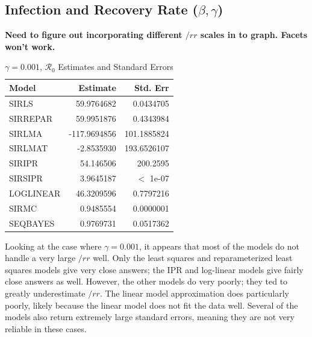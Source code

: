 \documentclass[12pt]{article}
\newcommand{\rr}{\ensuremath{\mathcal{R}_0}}
\begin{document}
\subsection{Infection and Recovery Rate ($\beta, \gamma$)}\label{sec:res-beta-gamma}

\textbf{Need to figure out incorporating different $/rr$ scales in to graph. Facets won't work.}

\begin{table}[H]
	
	\caption{\label{tab:}$\gamma = 0.001$, $\rr$ Estimates and Standard Errors}
	\centering
	\begin{tabular}[t]{l|r|r}
		\hline
		Model & Estimate & Std. Err\\
		\hline
		SIRLS & 59.9764682 & 0.0434705\\
		\hline
		SIRREPAR & 59.9951876 & 0.4343984\\
		\hline
		SIRLMA &  -117.9694856 & 101.1885824\\
		\hline
		SIRLMAT & -2.8535930 & 193.6526107 \\
		\hline
		SIRIPR & 54.146506 & 200.2595\\
		\hline
		SIRSIPR & 3.9645187 & $<$ 1e-07\\
		\hline
		LOGLINEAR & 46.3209596 & 0.7797216\\
		\hline
		SIRMC & 0.9485554 & 0.0000001\\
		\hline
		SEQBAYES & 0.9769731 & 0.0517362\\
		\hline
	\end{tabular}
\end{table}

Looking at the case where $\gamma = 0.001$, it appears that most of the models do not handle a very large $/rr$ well. Only the least squares and reparameterized least squares models give very close answers; the IPR and log-linear models give fairly close answers as well. However, the other models do very poorly; they ted to greatly underestimate $/rr$. The linear model approximation does particularly poorly, likely because the linear model does not fit the data well. Several of the models also return extremely large standard errors, meaning they are not very reliable in these cases.
\end{document}
